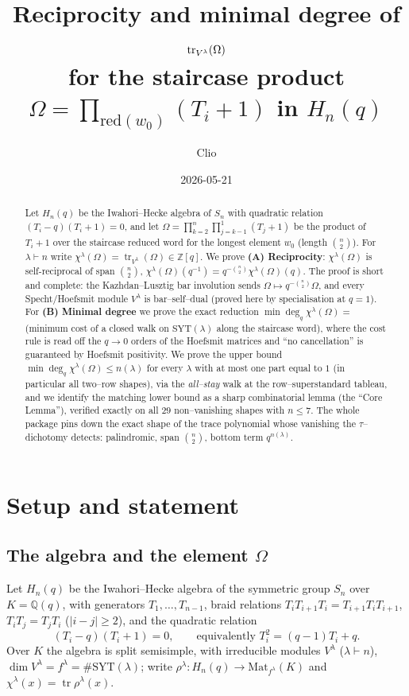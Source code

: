 \documentclass[11pt]{article}
\title{Reciprocity and minimal degree of $\tr_{V^\lambda}(\Omega)$\\
\large for the staircase product $\Omega=\prod_{\mathrm{red}(w_0)}(T_i+1)$ in $H_n(q)$}
\author{Clio}
\date{2026-05-21}
\theoremstyle{definition}
\DeclareMathOperator{\tr}{tr}
\newcommand{\Hn}{H_n(q)}
\newcommand{\SYT}{\mathrm{SYT}}
\newcommand{\qinv}{q^{-1}}
\begin{document}
\maketitle

\begin{abstract}
Let $\Hn$ be the Iwahori--Hecke algebra of $S_n$ with quadratic relation
$(T_i-q)(T_i+1)=0$, and let
$\Omega=\prod_{k=2}^{n}\prod_{j=k-1}^{1}(T_j+1)$
be the product of $T_i+1$ over the staircase reduced word for the longest
element $w_0$ (length $\binom n2$). For $\lambda\vdash n$ write
$\chi^\lambda(\Omega)=\tr_{V^\lambda}(\Omega)\in\mathbb Z[q]$.
We prove \textbf{(A) Reciprocity}: $\chi^\lambda(\Omega)$ is self-reciprocal
of span $\binom n2$,
$\chi^\lambda(\Omega)(\qinv)=q^{-\binom n2}\chi^\lambda(\Omega)(q)$.
The proof is short and complete: the Kazhdan--Lusztig bar involution sends
$\Omega\mapsto q^{-\binom n2}\Omega$, and every Specht/Hoefsmit module
$V^\lambda$ is bar--self--dual (proved here by specialisation at $q=1$).
For \textbf{(B) Minimal degree} we prove the exact reduction
$\min\deg_q\chi^\lambda(\Omega)=$ (minimum cost of a closed walk on
$\SYT(\lambda)$ along the staircase word), where the cost rule is read off
the $q\to0$ orders of the Hoefsmit matrices and ``no cancellation'' is
guaranteed by Hoefsmit positivity. We prove the upper bound
$\min\deg_q\chi^\lambda(\Omega)\le n(\lambda)$ for every $\lambda$ with at
most one part equal to $1$ (in particular all two--row shapes), via the
\emph{all--stay} walk at the row--superstandard tableau, and we identify the
matching lower bound as a sharp combinatorial lemma (the ``Core Lemma''),
verified exactly on all $29$ non--vanishing shapes with $n\le7$. The whole
package pins down the exact shape of the trace polynomial whose vanishing the
$\tau$--dichotomy detects: palindromic, span $\binom n2$, bottom term
$q^{n(\lambda)}$.
\end{abstract}

\section{Setup and statement}

\subsection{The algebra and the element $\Omega$}
Let $\Hn$ be the Iwahori--Hecke algebra of the symmetric group $S_n$ over
$K=\mathbb Q(q)$, with generators $T_1,\dots,T_{n-1}$, braid relations
$T_iT_{i+1}T_i=T_{i+1}T_iT_{i+1}$, $T_iT_j=T_jT_i$ ($|i-j|\ge2$), and the
quadratic relation
\begin{equation}\label{eq:quad}
(T_i-q)(T_i+1)=0,\qquad\text{equivalently } T_i^2=(q-1)T_i+q .
\end{equation}
Over $K$ the algebra is split semisimple, with irreducible modules
$V^\lambda$ ($\lambda\vdash n$), $\dim V^\lambda=f^\lambda=\#\SYT(\lambda)$;
write $\rho^\lambda\colon\Hn\to\mathrm{Mat}_{f^\lambda}(K)$ and
$\chi^\lambda(x)=\tr\rho^\lambda(x)$.
\end{document}
